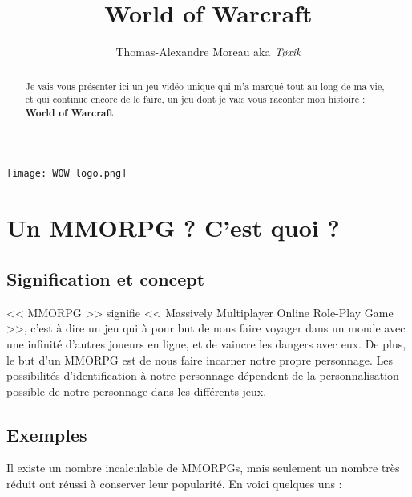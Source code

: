 \documentclass{article}
\title{\Huge World of Warcraft}
\author{Thomas-Alexandre Moreau aka \textit{Tøxik}}
\begin{document}
\maketitle

\begin{center}
    \texttt{[image: WOW logo.png]}
\end{center}


\pagebreak

\begin{abstract}
    Je vais vous présenter ici un jeu-vidéo unique qui m'a marqué tout au long de ma vie,
    et qui continue encore de le faire, un jeu dont je vais vous raconter mon histoire :
    \textbf{World of Warcraft}.
\end{abstract}

\pagebreak

\tableofcontents

\pagebreak

\section{Un MMORPG ? C'est quoi ?}

\subsection{Signification et concept}

<< MMORPG >> signifie << Massively Multiplayer Online Role-Play Game >>, c'est à dire un jeu qui à
pour but de nous faire voyager dans un monde avec une infinité d'autres joueurs en ligne, et
de vaincre les dangers avec eux.\newline
De plus, le but d'un MMORPG est de nous faire incarner notre propre personnage. Les
possibilités d'identification à notre personnage dépendent de la personnalisation
possible de notre personnage dans les différents jeux.

\subsection{Exemples}

Il existe un nombre incalculable de MMORPGs, mais seulement un nombre très réduit ont réussi
à conserver leur popularité. En voici quelques uns : \bigskip
\end{document}
